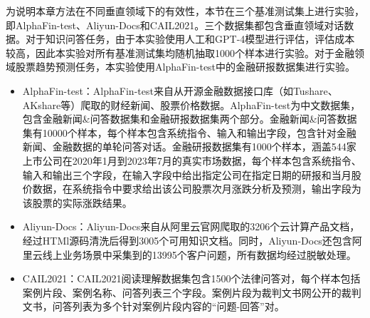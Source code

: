 为说明本章方法在不同垂直领域下的有效性，本节在三个基准测试集上进行实验，即AlphaFin-test、Aliyun-Docs和CAIL2021\cite{zhong2019jec}。三个数据集都包含垂直领域对话数据。对于知识问答任务，由于本实验使用人工和GPT-4模型进行评估，评估成本较高，因此本实验对所有基准测试集均随机抽取1000个样本进行实验。对于金融领域股票趋势预测任务，本实验使用AlphaFin-test中的金融研报数据集进行实验。


\begin{itemize}[topsep = 0 pt, itemsep= 0 pt, parsep=0pt, partopsep=0pt, leftmargin=36pt, itemindent=0pt, labelsep=6pt, listparindent=24pt]

	\item AlphaFin-test：AlphaFin-test来自从开源金融数据接口库（如Tushare\cite{tushare}、AKshare\cite{akshare}等）爬取的财经新闻、股票价格数据。AlphaFin-test为中文数据集，包含金融新闻\&问答数据集和金融研报数据集两个部分。金融新闻\&问答数据集有10000个样本，每个样本包含系统指令、输入和输出字段，包含针对金融新闻、金融数据的单轮问答对话。金融研报数据集有1000个样本，涵盖544家上市公司在2020年1月到2023年7月的真实市场数据，每个样本包含系统指令、输入和输出三个字段，在输入字段中给出指定公司在指定日期的研报和当月股价数据，在系统指令中要求给出该公司股票次月涨跌分析及预测，输出字段为该股票的实际涨跌结果。
	
	\item Aliyun-Docs：Aliyun-Docs来自从阿里云官网爬取的3206个云计算产品文档，经过HTMl源码清洗后得到3005个可用知识文档。同时，Aliyun-Docs还包含阿里云线上业务场景中采集到的13995个客户问题，所有数据均经过脱敏处理。
	
	\item CAIL2021：CAIL2021阅读理解数据集包含1500个法律问答对，每个样本包括案例片段、案例名称、问答列表三个字段。案例片段为裁判文书网公开的裁判文书，问答列表为多个针对案例片段内容的“问题-回答”对。
\end{itemize}

